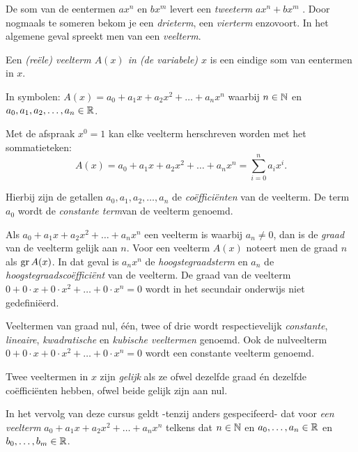 \documentclass{ximera}
\begin{document}
\author{Koen de Naeghel - Wiskunde Op Maat}



De som van de eentermen  $ax^n$ en $bx^m$ levert een \textit{tweeterm} $ax^n + bx^m$ . Door nogmaals te someren bekom je een {\em drieterm}, een {\em vierterm} enzovoort. In het algemene geval spreekt men van een {\em veelterm}.

\begin{definition} 
Een \textit{(reële) veelterm \(A(x)\) in (de variabele) $x$} is een eindige som van eentermen in $x$.

In symbolen: $A(x) = a_0 + a_1x + a_2x^2 + \dots + a_n x^n$ waarbij $n \in \mathbb{N}$ en $a_0,a_1,a_2,\ldots,a_n \in \mathbb{R}$.


Met de afspraak $x^0 = 1$ kan elke veelterm herschreven worden met het sommatieteken:
\[
A(x) = a_0 + a_1x + a_2x^2 + \dots + a_n x^n = \sum_{i=0}^n a_i x^i.
\]

Hierbij zijn de getallen $a_0, a_1, a_2, \ldots, a_n$ de \textit{coëfficiënten} van de veelterm. De term $a_0$ wordt de \textit{constante term}van de veelterm genoemd.


Als $a_0 + a_1x + a_2x^2 + \dots + a_n x^n$ een veelterm is waarbij $a_n \neq 0$, dan is de \textit{graad} van de veelterm gelijk aan $n$. Voor een veelterm $A(x)$ noteert men de graad \(n\) als $\operatorname{gr} A(x)$. In dat geval is $a_nx^n$ de \textit{hoogstegraadsterm} en $a_n$ de \textit{hoogstegraadscoëfficiënt} van de veelterm. De graad van de veelterm $0 + 0\cdot x + 0 \cdot x^2 + \dots + 0\cdot x^n = 0$ wordt in het secundair onderwijs niet gedefiniëerd.

Veeltermen van graad nul, één, twee of drie wordt respectievelijk \textit{constante}, \textit{lineaire}, \linebreak \textit{kwadratische} en \textit{kubische veeltermen} genoemd. Ook de nulveelterm $0 + 0\cdot x + 0 \cdot x^2 + \dots + 0\cdot x^n = 0$ wordt een constante veelterm genoemd.


Twee veeltermen in $x$ zijn \textit{gelijk} als ze ofwel dezelfde graad én dezelfde coëfficiënten hebben, ofwel beide gelijk zijn aan nul. 


\end{definition}




\begin{notation}
    
    In het vervolg van deze cursus geldt -tenzij anders gespecifeerd- dat voor {\em een veelterm} $a_0 + a_1x + a_2x^2 + \dots + a_n x^n$ telkens dat $n \in \mathbb{N}$ en $a_0, \ldots, a_n\in \mathbb{R}$ en $b_0, \ldots, b_m\in \mathbb{R}$.
    
\end{notation}
\end{document}
